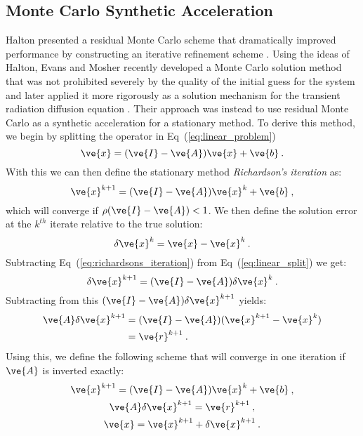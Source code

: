 \documentclass[letterpaper,11pt]{article}
\begin{document}
\subsection{Monte Carlo Synthetic Acceleration}
Halton presented a residual Monte Carlo scheme that dramatically
improved performance by constructing an iterative refinement scheme
\cite{halton_sequential_1962}. Using the ideas of Halton, Evans and
Mosher recently developed a Monte Carlo solution method that was not
prohibited severely by the quality of the initial guess for the system
\cite{evans_monte_2009} and later applied it more rigorously as a
solution mechanism for the transient radiation diffusion equation
\cite{evans_monte_2014}. Their approach was instead to use residual
Monte Carlo as a synthetic acceleration for a stationary method. To
derive this method, we begin by splitting the operator in
Eq~(\ref{eq:linear_problem})
\begin{equation}
  \ve{x} = (\ve{I} - \ve{A})\ve{x} + \ve{b}\:.
  \label{eq:linear_split}
\end{equation}
With this we can then define the stationary method
\textit{Richardson's iteration} as:
\begin{equation}
  \ve{x}^{k+1} = (\ve{I} - \ve{A})\ve{x}^k + \ve{b}\:,
  \label{eq:richardsons_iteration}
\end{equation}
which will converge if $\rho(\ve{I} - \ve{A}) < 1$. We then define the
solution error at the $k^{th}$ iterate relative to the true solution:
\begin{equation}
  \delta \ve{x}^k = \ve{x} - \ve{x}^k\:.
  \label{eq:mcsa_error}
\end{equation}
Subtracting Eq~(\ref{eq:richardsons_iteration}) from
Eq~(\ref{eq:linear_split}) we get:
\begin{equation}
  \delta \ve{x}^{k+1} = (\ve{I} - \ve{A})\delta \ve{x}^k\:.
  \label{eq:mcsa_setup_1}
\end{equation}
Subtracting from this $(\ve{I} - \ve{A})\delta \ve{x}^{k+1}$ yields:
\begin{equation}
  \begin{split}
    \ve{A}\delta \ve{x}^{k+1} &= (\ve{I} -
    \ve{A})(\ve{x}^{k+1}-\ve{x}^{k}) \\ &= \ve{r}^{k+1}\:.
    \label{eq:mcsa_setup_2}
  \end{split}
\end{equation}
Using this, we define the following scheme that will converge in one
iteration if $\ve{A}$ is inverted exactly:
\begin{subequations}
  \begin{gather}
    \ve{x}^{k+1} = (\ve{I} - \ve{A})\ve{x}^k + \ve{b}\:,\\
    \ve{A} \delta \ve{x}^{k+1} = \ve{r}^{k+1}\:,\\
    \ve{x} = \ve{x}^{k+1} + \delta \ve{x}^{k+1}\:.
  \end{gather}
  \label{eq:mcsa_setup_3}
\end{subequations}
\end{document}
